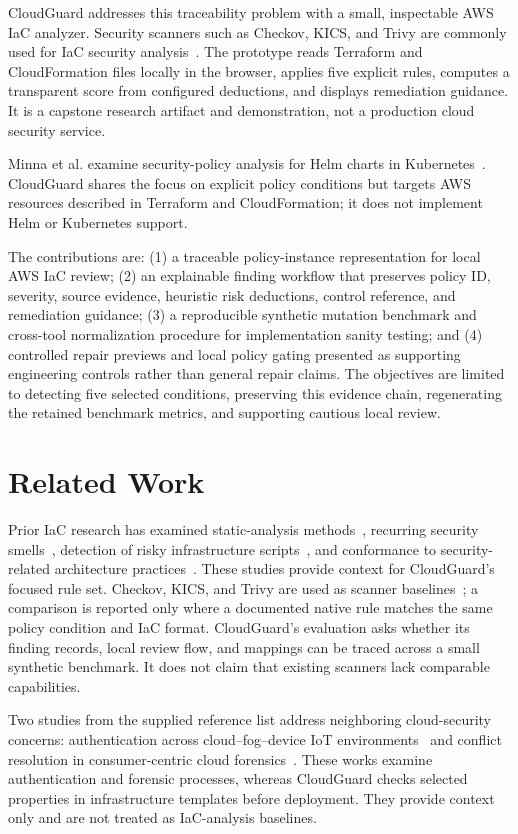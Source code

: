 \documentclass[conference]{IEEEtran}
\begin{document}
CloudGuard addresses this traceability problem with a small, inspectable AWS IaC analyzer. Security scanners such as Checkov, KICS, and Trivy are commonly used for IaC security analysis~\cite{checkov,kics,trivy}. The prototype reads Terraform and CloudFormation files locally in the browser, applies five explicit rules, computes a transparent score from configured deductions, and displays remediation guidance. It is a capstone research artifact and demonstration, not a production cloud security service.

Minna et al. examine security-policy analysis for Helm charts in Kubernetes~\cite{minna2026automated}. CloudGuard shares the focus on explicit policy conditions but targets AWS resources described in Terraform and CloudFormation; it does not implement Helm or Kubernetes support.

The contributions are: (1) a traceable policy-instance representation for local AWS IaC review; (2) an explainable finding workflow that preserves policy ID, severity, source evidence, heuristic risk deductions, control reference, and remediation guidance; (3) a reproducible synthetic mutation benchmark and cross-tool normalization procedure for implementation sanity testing; and (4) controlled repair previews and local policy gating presented as supporting engineering controls rather than general repair claims. The objectives are limited to detecting five selected conditions, preserving this evidence chain, regenerating the retained benchmark metrics, and supporting cautious local review.

\section{Related Work}
Prior IaC research has examined static-analysis methods~\cite{chiari2022survey}, recurring security smells~\cite{rahman2019sins}, detection of risky infrastructure scripts~\cite{dai2020risky}, and conformance to security-related architecture practices~\cite{ntentos2022conformance}. These studies provide context for CloudGuard's focused rule set. Checkov, KICS, and Trivy are used as scanner baselines~\cite{checkov,kics,trivy}; a comparison is reported only where a documented native rule matches the same policy condition and IaC format. CloudGuard's evaluation asks whether its finding records, local review flow, and mappings can be traced across a small synthetic benchmark. It does not claim that existing scanners lack comparable capabilities.

Two studies from the supplied reference list address neighboring cloud-security concerns: authentication across cloud--fog--device IoT environments~\cite{sukumar2026keymgmt} and conflict resolution in consumer-centric cloud forensics~\cite{sukumar2026forensics}. These works examine authentication and forensic processes, whereas CloudGuard checks selected properties in infrastructure templates before deployment. They provide context only and are not treated as IaC-analysis baselines.
\end{document}
